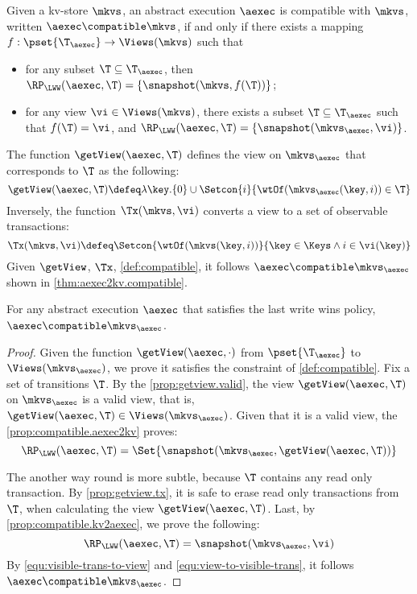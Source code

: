 \begin{definition}
\label{def:compatible}
Given a kv-store $\mkvs$,
an abstract execution $\aexec$ is compatible with $\mkvs$, written 
$\aexec \compatible \mkvs$, if and only if there exists a  mapping 
$f: \pset{\T_{\aexec}} \rightarrow \Views(\mkvs)$
such that  
\begin{itemize}
\item for any subset $\T \subseteq \T_{\aexec}$, then $\RP_{\LWW}(\aexec, \T) = \{\snapshot(\mkvs, f(\T))\}$; 
\item for any view $\vi \in \Views(\mkvs)$, there exists a subset $\T \subseteq \T_{\aexec}$ 
such that $f(\T) = \vi$, and $\RP_{\LWW}(\aexec, \T) = \{\snapshot(\mkvs_{\aexec}, \vi)\}$.
\end{itemize}
\end{definition}

The function $\getView(\aexec, \T)$ defines the view on \( \mkvs_\aexec \) that corresponds to \( \T \) as the following:
\[
    \getView(\aexec, \T) \defeq \lambda \key. \{0\} \cup \Setcon{ i }{\wtOf(\mkvs_{\aexec}(\key, i)) \in \T}
\]
Inversely, the function \( \Tx(\mkvs, \vi) \) converts a view to a set of observable transactions:
\[
\Tx(\mkvs, \vi) \defeq \Setcon{ \wtOf(\mkvs(\key, i)) }{ \key \in \Keys \wedge i \in \vi(\key) }
\]
Given \( \getView \), \( \Tx \), \cref{def:compatible}, 
it follows \( \aexec \compatible \mkvs_{\aexec} \) shown in \cref{thm:aexec2kv.compatible}.

\begin{theorem}
\label{thm:aexec2kv.compatible}
For any abstract execution $\aexec$ that satisfies the last write wins policy, $\aexec \compatible \mkvs_{\aexec}$.
\end{theorem}
\begin{proof}
Given the function $\getView(\aexec, \cdot )$ from $\pset{\T_{\aexec}}$ to $\Views(\mkvs_{\aexec})$,
we prove it satisfies the constraint of \cref{def:compatible}.
Fix a set of transitions \( \T \).
By the \cref{prop:getview.valid}, the view $\getView(\aexec, \T )$  on \( \mkvs_\aexec \) is a valid view,
that is, \( \getView(\aexec, \T ) \in \Views(\mkvs_\aexec) \).
Given that it is a valid view, the \cref{prop:compatible.aexec2kv} proves:
\begin{equation}
    \label{equ:visible-trans-to-view}
    \RP_{\LWW}(\aexec, \T) = \Set{\snapshot(\mkvs_{\aexec}, \getView(\aexec, \T))} 
\end{equation}

The another way round is more subtle,
because \( \T \) contains any read only transaction.
By \cref{prop:getview.tx}, it is safe to erase read only transactions from \( \T \),
when calculating the view \( \getView(\aexec, \T ) \).
Last, by \cref{prop:compatible.kv2aexec}, we prove the following:
\begin{equation}
    \label{equ:view-to-visible-trans}
    \RP_{\LWW}(\aexec, \T) = \snapshot(\mkvs_{\aexec}, \vi)
\end{equation}
By \cref{equ:visible-trans-to-view} and \cref{equ:view-to-visible-trans},
it follows \( \aexec \compatible \mkvs_{\aexec} \).
\end{proof}

